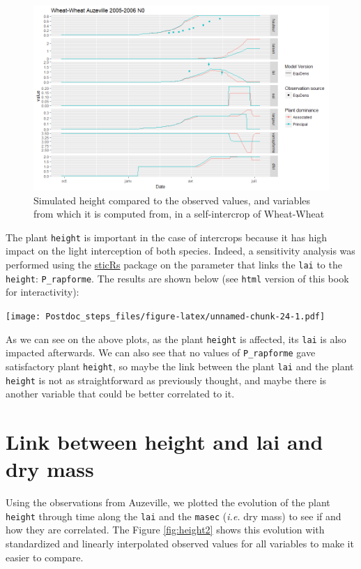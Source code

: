 \documentclass[
]{book}
\begin{document}
\begin{figure}
\centering
\includegraphics{img/height1.png}
\caption{\label{fig:height1}Simulated height compared to the observed values, and variables from which it is computed from, in a self-intercrop of Wheat-Wheat}
\end{figure}

The plant \texttt{height} is important in the case of intercrops because it has high impact on the light interception of both species.
Indeed, a sensitivity analysis was performed using the \href{https://github.com/VEZY/sticRs}{sticRs} package on the parameter that links the \texttt{lai} to the \texttt{height}: \texttt{P\_rapforme}. The results are shown below (see \texttt{html} version of this book for interactivity):

\texttt{[image: Postdoc\_steps\_files/figure-latex/unnamed-chunk-24-1.pdf]}

As we can see on the above plots, as the plant \texttt{height} is affected, its \texttt{lai} is also impacted afterwards.
We can also see that no values of \texttt{P\_rapforme} gave satisfactory plant \texttt{height}, so maybe the link between the plant \texttt{lai} and the plant \texttt{height} is not as straightforward as previously thought, and maybe there is another variable that could be better correlated to it.

\hypertarget{link-between-height-and-lai-and-dry-mass}{%
\section{Link between height and lai and dry mass}\label{link-between-height-and-lai-and-dry-mass}}

Using the observations from Auzeville, we plotted the evolution of the plant \texttt{height} through time along the \texttt{lai} and the \texttt{masec} (\emph{i.e.} dry mass) to see if and how they are correlated. The Figure \ref{fig:height2} shows this evolution with standardized and linearly interpolated observed values for all variables to make it easier to compare.
\end{document}
